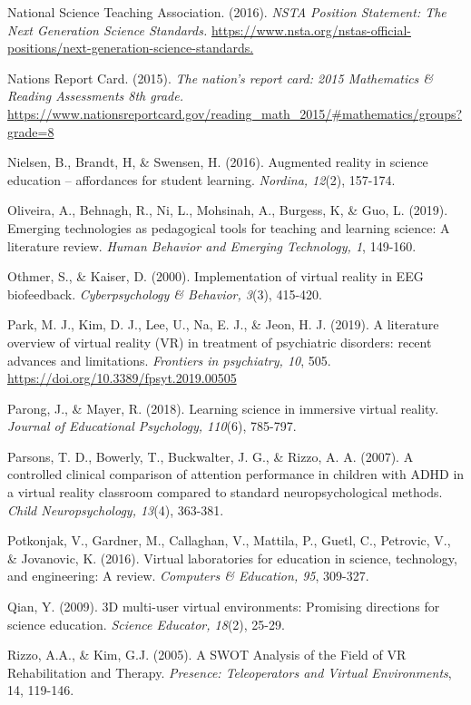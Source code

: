 \documentclass[11.5pt]{sig-alternate} %
\begin{document}
National Science Teaching Association. (2016). \textit{NSTA Position Statement: The Next Generation Science Standards.} \url{https://www.nsta.org/nstas-official-positions/next-generation-science-standards.}

Nations Report Card. (2015). \textit{The nation’s report card: 2015 Mathematics \& Reading Assessments 8th grade.} \url{https://www.nationsreportcard.gov/reading\_math\_2015/\#mathematics/groups?grade=8}

Nielsen, B., Brandt, H, \& Swensen, H. (2016). Augmented reality in science education – affordances for student learning. \textit{Nordina, 12}(2), 157-174.

Oliveira, A., Behnagh, R., Ni, L., Mohsinah, A., Burgess, K, \& Guo, L. (2019). Emerging technologies as pedagogical tools for teaching and learning science: A literature review. \textit{Human Behavior and Emerging Technology, 1}, 149-160.

Othmer, S., \& Kaiser, D. (2000). Implementation of virtual reality in EEG biofeedback. \textit{Cyberpsychology \& Behavior, 3}(3), 415-420.

Park, M. J., Kim, D. J., Lee, U., Na, E. J., \& Jeon, H. J. (2019). A literature overview of virtual reality (VR) in treatment of psychiatric disorders: recent advances and 	limitations. \textit{Frontiers in psychiatry, 10}, 505. \url{https://doi.org/10.3389/fpsyt.2019.00505}

Parong, J., \& Mayer, R. (2018). Learning science in immersive virtual reality. \textit{Journal of Educational Psychology, 110}(6), 785-797.

Parsons, T. D., Bowerly, T., Buckwalter, J. G., \& Rizzo, A. A. (2007). A controlled clinical comparison of attention performance in children with ADHD in a virtual reality classroom compared to standard neuropsychological methods. \textit{Child Neuropsychology, 13}(4), 363-381.

Potkonjak, V., Gardner, M., Callaghan, V., Mattila, P., Guetl, C., Petrovic, V., \& Jovanovic, K. (2016). Virtual laboratories for education in science, technology, and engineering: A review. \textit{Computers \& Education, 95}, 309-327.

Qian, Y. (2009). 3D multi-user virtual environments: Promising directions for science education. \textit{Science Educator, 18}(2), 25-29.

Rizzo, A.A., \& Kim, G.J. (2005). A SWOT Analysis of the Field of VR Rehabilitation and Therapy. \textit{Presence: Teleoperators and Virtual Environments}, 14, 119-146.
 
\end{document}
